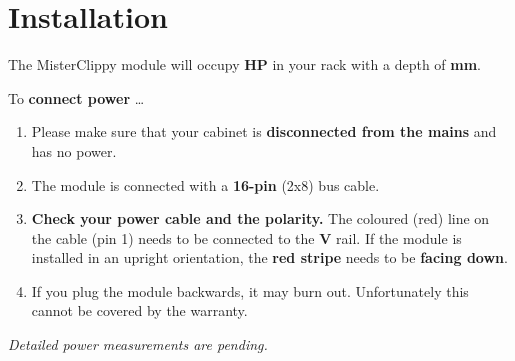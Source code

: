 \documentclass[a4paper,
               11pt,
               parskip=half,
               headinclude,
               titlepage=false]{scrartcl}
\begin{document}
\section*{Installation}

The MisterClippy module will occupy \textbf{\unit[12]{HP}} in your rack with a depth of \textbf{\unit[20]{mm}}.

To \textbf{connect power} …
\begin{enumerate}
 \item Please make sure that your cabinet is \textbf{disconnected from the mains} and has no power.
 \item The module is connected with a \textbf{16-pin} (2x8) bus cable.
 \item \textbf{Check your power cable and the polarity.} The coloured ({\color{red}red}) line on the cable (pin 1) needs to be connected to the \textbf{\unit[-12]{V}} rail.
 If the module is installed in an upright orientation, the \textbf{\color{red}red stripe} needs to be \textbf{facing down}.
 \item If you plug the module backwards, it may burn out.
 Unfortunately this cannot be covered by the warranty.
\end{enumerate}

\emph{Detailed power measurements are pending.}
\end{document}
